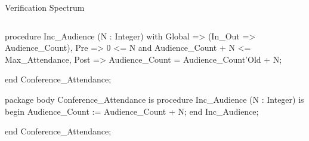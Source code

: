 \documentclass{beamer}
\begin{document}
\begin{frame}[fragile]{Verification Spectrum}
\begin{columns}
\begin{column}{9cm}
\begin{onlyenv}
\begin{pxcode}[language=SPARK,style=magic,gobble=8]
           procedure Inc_Audience (N : Integer)
           with Global => (In_Out => Audience_Count),
                Pre    => 0 <= N and Audience_Count + N <= Max_Attendance,
                Post   => Audience_Count = Audience_Count'Old + N;

        end Conference_Attendance;

        package body Conference_Attendance
        is
           procedure Inc_Audience (N : Integer)
           is
           begin
              Audience_Count := Audience_Count + N;
           end Inc_Audience;

        end Conference_Attendance;
      \end{pxcode}
      \end{onlyenv}







    \end{column}
  \end{columns}

\end{frame}
\end{document}
